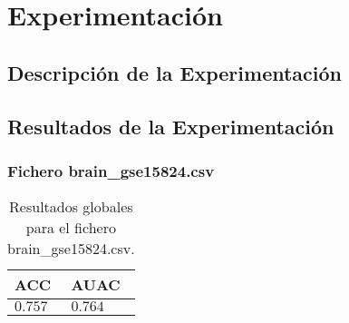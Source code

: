 \section{Experimentación}

\subsection{Descripción de la Experimentación}

\clearpage

\subsection{Resultados de la Experimentación}

\subsubsection{Fichero brain\_gse15824.csv}

\begin{table}[htp]
    \small
    \centering
    \begin{tabularx}{\columnwidth}{Y Y}
        ACC       & AUAC    \\\hline
        $0.757$   & $0.764$ \\\hline
    \end{tabularx}
    \caption{Resultados globales para el fichero brain\_gse15824.csv.}
    \label{tab:4}
\end{table}

